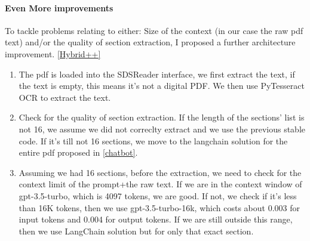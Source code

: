 \documentclass[a4paper,12pt,twoside]{report}
\begin{document}
\paragraph{Even More improvements}
To tackle problems relating to either: Size of the context (in our case the raw pdf text) and/or the quality of section extraction, I proposed a further architecture improvement. \ref{Hybrid++}
\begin{enumerate}
\item The pdf is loaded into the SDSReader interface, we first extract the text, if the text is empty, this means it's not a digital PDF. We then use PyTesseract OCR to extract the text.
\item Check for the quality of section extraction. If the length of the sections' list is not 16, we assume we did not correclty extract and we use the previous stable code. If it's till not 16 sections, we move to the langchain solution for the entire pdf proposed in \ref{chatbot}.
\item Assuming we had 16 sections, before the extraction, we need to check for the context limit of the prompt+the raw text. If we are in the context window of gpt-3.5-turbo, which is 4097 tokens, we are good. If not, we check if it's less than 16K tokens, then we use gpt-3.5-turbo-16k, which costs about 0.003 for input tokens and 0.004 for output tokens. If we are still outside this range, then we use LangChain solution but for only that exact section.
\end{enumerate}
\end{document}
